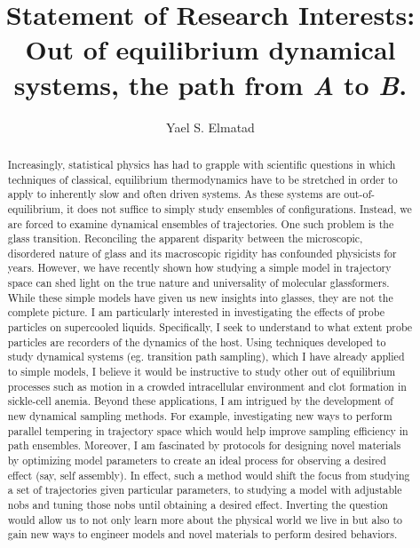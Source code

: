 \documentclass[11pt]{article}
\title{{{\textbf{Statement of Research Interests}}: \\Out of equilibrium dynamical systems, the path from \textit{A} to \textit{B}.}}
\author{Yael S. Elmatad}
\date{}                                           %
\begin{document}
\maketitle
%
\begin{abstract}
Increasingly, statistical physics has had to grapple with scientific questions in which techniques of classical, equilibrium thermodynamics have to be stretched in order to apply to inherently slow and often driven systems.   As these systems are out-of-equilibrium, it does not suffice to simply study ensembles of configurations. Instead, we are forced to examine dynamical ensembles of trajectories.  One such problem is the glass transition.  Reconciling the apparent disparity between the microscopic, disordered nature of glass and its macroscopic rigidity has confounded physicists for years. However, we have recently shown how studying a simple model in trajectory space can shed light on the true nature and universality of molecular glassformers.  While these simple models have given us new insights into glasses, they are not the complete picture. I am particularly interested in investigating the effects of probe particles on supercooled liquids.  Specifically, I seek to understand to what extent probe particles are recorders of the dynamics of the host.  Using techniques developed to study dynamical systems (eg. transition path sampling), which I have already applied to simple models, I believe it would be instructive to study other out of equilibrium processes such as motion in a crowded intracellular environment and clot formation in sickle-cell anemia.  Beyond these applications, I am intrigued by the development of new dynamical sampling methods.  For example, investigating new ways to perform parallel tempering in trajectory space which would help improve sampling efficiency in path ensembles.  Moreover, I am fascinated by protocols for designing novel materials by optimizing model parameters to create an ideal process for observing a desired effect (say, self assembly).  In effect, such a method would shift the focus from studying a set of trajectories given particular parameters, to studying a model with adjustable nobs and tuning those nobs until obtaining a desired effect. Inverting the question would allow us to not only learn more about the physical world we live in but also to gain new ways to engineer models and novel materials to perform desired behaviors.



\end{abstract}
\end{document}
